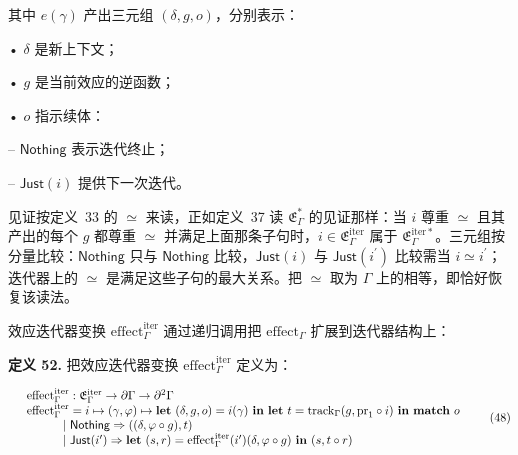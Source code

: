 \documentclass[
  10
]{article}
\begin{document}
其中 \(e ( \gamma )\) 产出三元组 \(( \delta , g , o )\)，分别表示：

• \(\delta\) 是新上下文；

• \(g\) 是当前效应的逆函数；

• \(o\) 指示续体：

– \(\mathsf { N o t h i n g }\) 表示迭代终止；

– \(\mathsf { J u s t } ( i )\) 提供下一次迭代。

见证按定义~33 的 $\simeq$ 来读，正如定义~37 读 \(\mathfrak { E } _ { \Gamma } ^ { * }\) 的见证那样：当 \(i\) 尊重 $\simeq$ 且其产出的每个 \(g\) 都尊重 $\simeq$ 并满足上面那条子句时，\(i \in \mathfrak { E } _ { \Gamma } ^ { \mathrm { i t e r } }\) 属于 \(\mathfrak { E } _ { \Gamma } ^ { \mathrm { i t e r * } }\)。三元组按分量比较：\(\mathsf { N o t h i n g }\) 只与 \(\mathsf { N o t h i n g }\) 比较，\(\mathsf { J u s t } ( i )\) 与 \(\mathsf { J u s t } ( i ^ { \prime } )\) 比较需当 \(i \simeq i ^ { \prime }\)；迭代器上的 $\simeq$ 是满足这些子句的最大关系。把 $\simeq$ 取为 \(\Gamma\) 上的相等，即恰好恢复该读法。

效应迭代器变换 \(\mathrm { e f f e c t } _ { \Gamma } ^ { \mathrm { i t e r } }\) 通过递归调用把 \(\mathrm { e f f e c t } _ { \Gamma }\) 扩展到迭代器结构上：

\textbf{定义 52.} 把效应迭代器变换 \(\mathrm { e f f e c t } _ { \Gamma } ^ { \mathrm { i t e r } }\) 定义为：

\[
\begin{array} { r l } & { \mathrm { e f f e c t } _ { \Gamma } ^ { \mathrm { i t e r } } : \mathfrak { E } _ { \Gamma } ^ { \mathrm { i t e r } } \to \partial \Gamma \to \partial ^ { 2 } \Gamma } \\ & { \mathrm { e f f e c t } _ { \Gamma } ^ { \mathrm { i t e r } } = i \mapsto ( \gamma , \varphi ) \mapsto \mathbf { l e t } \ ( \delta , g , o ) = i ( \gamma ) \ \mathbf { i n } \ \mathbf { l e t } \ t = \mathrm { t r a c k } _ { \Gamma } ( g , \mathrm { p r } _ { 1 } \circ i ) \ \mathbf { i n } \ \mathbf { m a t c h } \ o } \\ & { \qquad \quad | \ \mathsf { N o t h i n g } \Rightarrow ( ( \delta , \varphi \circ g ) , t ) } \\ & { \qquad \quad | \ \mathsf { J u s t } ( i ^ { \prime } ) \Rightarrow \mathbf { l e t } \ ( s , r ) = \mathrm { e f f e c t } _ { \Gamma } ^ { \mathrm { i t e r } } ( i ^ { \prime } ) ( \delta , \varphi \circ g ) \ \mathbf { i n } \ ( s , t \circ r ) } \end{array}\tag{48}
\]
\end{document}
